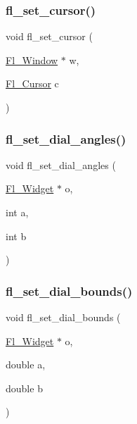 \mbox{\label{forms_8_h_ab0a220cb79ec917a58acce6c2fa762a5}} 
\subsubsection{\texorpdfstring{fl\+\_\+set\+\_\+cursor()}{fl\_set\_cursor()}}
{\footnotesize\ttfamily void fl\+\_\+set\+\_\+cursor (\begin{DoxyParamCaption}\item[{\hyperlink{class_fl___window}{Fl\+\_\+\+Window} $\ast$}]{w,  }\item[{\hyperlink{_enumerations_8_h_a72bde974edc7926b1217dd51b8c7e8e0}{Fl\+\_\+\+Cursor}}]{c }\end{DoxyParamCaption})\hspace{0.3cm}{\ttfamily [inline]}}

\mbox{\label{forms_8_h_aa0398dcc387465e1c775b54bb540c767}} 
\subsubsection{\texorpdfstring{fl\+\_\+set\+\_\+dial\+\_\+angles()}{fl\_set\_dial\_angles()}}
{\footnotesize\ttfamily void fl\+\_\+set\+\_\+dial\+\_\+angles (\begin{DoxyParamCaption}\item[{\hyperlink{class_fl___widget}{Fl\+\_\+\+Widget} $\ast$}]{o,  }\item[{int}]{a,  }\item[{int}]{b }\end{DoxyParamCaption})\hspace{0.3cm}{\ttfamily [inline]}}

\mbox{\label{forms_8_h_a2c88aec07743563472dec8cd1918dee8}} 
\subsubsection{\texorpdfstring{fl\+\_\+set\+\_\+dial\+\_\+bounds()}{fl\_set\_dial\_bounds()}}
{\footnotesize\ttfamily void fl\+\_\+set\+\_\+dial\+\_\+bounds (\begin{DoxyParamCaption}\item[{\hyperlink{class_fl___widget}{Fl\+\_\+\+Widget} $\ast$}]{o,  }\item[{double}]{a,  }\item[{double}]{b }\end{DoxyParamCaption})\hspace{0.3cm}{\ttfamily [inline]}}

